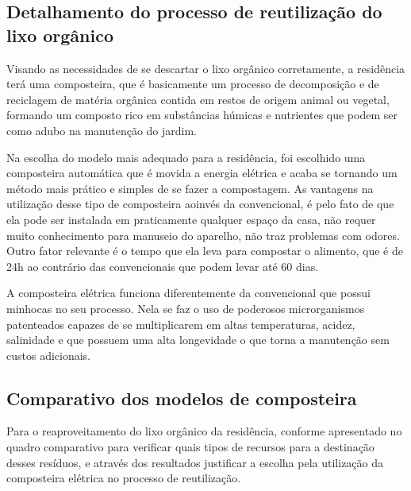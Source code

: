 \subsection{Detalhamento do processo de reutilização do lixo orgânico}

Visando as necessidades de se descartar o lixo orgânico corretamente, a residência terá
uma composteira, que é basicamente um processo de decomposição e de reciclagem de matéria
orgânica contida em restos de origem animal ou vegetal, formando um composto rico em
substâncias húmicas e nutrientes que podem ser como adubo na manutenção do jardim.

Na escolha do modelo mais adequado para a residência, foi escolhido uma composteira
automática que é movida a energia elétrica e acaba se tornando um método mais prático e
simples de se fazer a compostagem. As vantagens na utilização desse tipo de composteira aoinvés da convencional, é pelo fato de que ela pode ser instalada em praticamente qualquer
espaço da casa, não requer muito conhecimento para manuseio do aparelho, não traz
problemas com odores. Outro fator relevante é o tempo que ela leva para compostar o alimento,
que é de 24h ao contrário das convencionais que podem levar até 60 dias.

A composteira elétrica funciona diferentemente da convencional que possui minhocas
no seu processo. Nela se faz o uso de poderosos microrganismos patenteados capazes de se
multiplicarem em altas temperaturas, acidez, salinidade e que possuem uma alta longevidade
o que torna a manutenção sem custos adicionais.

\subsection{Comparativo dos modelos de composteira}

Para o reaproveitamento do lixo orgânico da residência, conforme apresentado no
quadro comparativo para verificar quais tipos de recursos para a destinação desses resíduos, e
através dos resultados justificar a escolha pela utilização da composteira elétrica no processo de
reutilização.

